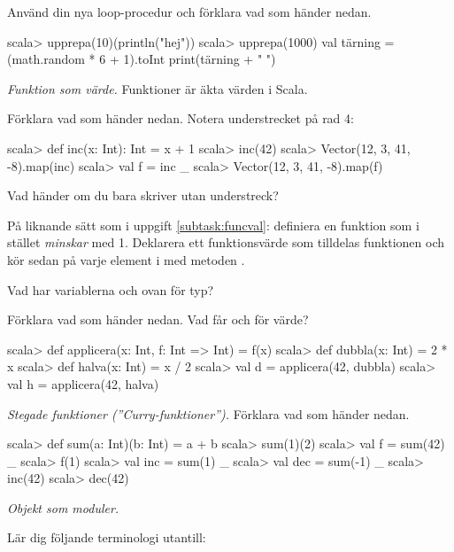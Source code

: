 \Subtask Använd din nya loop-procedur och förklara vad som händer nedan.
\begin{REPL}
scala> upprepa(10)(println("hej"))
scala> upprepa(1000){
  val tärning = (math.random * 6 + 1).toInt
  print(tärning + " ")
}
\end{REPL}



\Task \emph{Funktion som värde.} Funktioner är äkta värden i Scala.

\Subtask \label{subtask:funcval} Förklara vad som händer nedan. Notera understrecket på rad 4:

\begin{REPL}[numbers=left, numberstyle=\color{black}\ttfamily\scriptsize\selectfont]
scala> def inc(x: Int): Int = x + 1
scala> inc(42)
scala> Vector(12, 3, 41, -8).map(inc)
scala> val f = inc _
scala> Vector(12, 3, 41, -8).map(f)
\end{REPL}

\Subtask Vad händer om du bara skriver  utan understreck?

\Subtask På liknande sätt som i uppgift \ref{subtask:funcval}: definiera en funktion  som i stället \emph{minskar} med 1. Deklarera ett funktionsvärde  som tilldelas funktionen  och kör sedan  på varje element i  med metoden .

\Subtask\Pen Vad har variablerna  och  ovan för typ?

\Subtask Förklara vad som händer nedan. Vad får  och  för värde?

\begin{REPL}
scala> def applicera(x: Int, f: Int => Int) = f(x)
scala> def dubbla(x: Int) = 2 * x
scala> def halva(x: Int) = x / 2
scala> val d = applicera(42, dubbla)
scala> val h = applicera(42, halva)
\end{REPL}

\Task\emph{Stegade funktioner (''Curry-funktioner'').} Förklara vad som händer nedan.
\begin{REPL}
scala> def sum(a: Int)(b: Int) = a + b
scala> sum(1)(2)
scala> val f = sum(42) _
scala> f(1)
scala> val inc = sum(1) _
scala> val dec = sum(-1) _
scala> inc(42)
scala> dec(42)
\end{REPL}

\Task \emph{Objekt som moduler.}

\Subtask Lär dig följande terminologi utantill:

